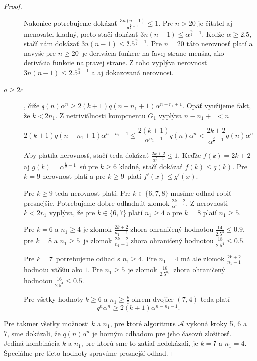 \begin{proof}
\begin{description}
    Nakoniec potrebujeme dokázať $\frac{3n(n-1)}{\alpha^{\frac{n}{2}-1}} \leq 1$. Pre $n > 20$ je čitateľ aj
    menovateľ kladný, preto stačí dokázať $3n(n-1) \leq \alpha^{\frac{n}{2} - 1}$. Keďže $\alpha \ge 2.5$,
    stačí nám dokázať $3n(n-1) \leq 2.5^{\frac{n}{2} - 1}$. Pre $n = 20$ táto nerovnosť platí a navyše
    pre $n \ge 20$ je derivácia funkcie na ľavej strane menšia, ako derivácia funkcie na pravej strane.
    Z toho vyplýva nerovnosť $3n(n-1) \leq 2.5^{\frac{n}{2}-1}$ a aj dokazovaná nerovnosť.

    \item[$\boxed{a \ge 2c}$], čiže $q(n) \alpha^n \ge 2(k+1)q(n - n_1 + 1)\alpha^{n - n_1 + 1}$.
    Opäť využijeme fakt, že $k < 2n_1$. Z netriviálnosti komponentu $G_1$ vyplýva $n - n_1 + 1 < n$ 

    $$2(k+1)q(n - n_1 + 1)\alpha^{n - n_1 + 1} \leq \frac{2(k+1)}{\alpha^{n_1 - 1}}q(n)\alpha^n < \frac{2k + 2}{\alpha^{\frac{k}{2} - 1}} q(n)\alpha^n$$

    Aby platila nerovnosť, stačí teda dokázať $\frac{2k + 2}{\alpha^{\frac{k}{2} - 1}} \leq 1$. Keďže
    $f(k) = 2k + 2$ aj $g(k) = \alpha^{\frac{k}{2} - 1}$ sú pre $k \ge 6$ kladné, stačí dokázať
    $f(k) \leq g(k)$. Pre $k = 9$ nerovnosť platí a pre $k \ge 9$ platí $f'(x) \leq g'(x)$.

    Pre $k \ge 9$ teda nerovnosť platí. Pre $k \in \{6, 7, 8\}$ musíme odhad robiť presnejšie.
    Potrebujeme dobre odhadnúť zlomok $\frac{2k+2}{\alpha^{n_1 - 1}}$. Z nerovnosti $k < 2n_1$
    vyplýva, že pre $k \in \{6, 7\}$ platí $n_1 \ge 4$ a pre $k = 8$ platí $n_1 \ge 5$.

    Pre $k=6$ a $n_1 \ge 4$ je zlomok $\frac{2k+2}{n_1 - 1}$ zhora ohraničený hodnotou $\frac{14}{2.5^3} \leq 0.9$,
    pre $k=8$ a $n_1 \ge 5$ je zlomok $\frac{2k+2}{n_1 - 1}$ zhora ohraničený hodnotou $\frac{18}{2.5^4} \leq 0.5$.

    Pre $k=7$ potrebujeme odhad s $n_1 \ge 4$. Pre $n_1 = 4$ má ale zlomok $\frac{2k+2}{n_1 - 1}$ hodnotu
    väčšiu ako $1$. Pre $n_1 \ge 5$ je zlomok $\frac{16}{2.5^{n_1}}$ zhora ohraničený hodnotou $\frac{16}{2.5^4} \leq 0.5$.

    Pre všetky hodnoty $k \ge 6$ a $n_1 \ge \frac{k}{2}$ okrem dvojice $(7, 4)$ teda platí
    $$q^n \alpha^n \ge 2(k+1)\alpha^{n - n_1 + 1}.$$

    \end{description}

    Pre takmer všetky možnosti $k$ a $n_1$, pre ktoré algoritmus $\mathcal{A}$ vykoná kroky 5, 6 a 7,
    sme dokázali, že $q(n) \alpha^n$ je horným odhadom pre jeho časovú zložitosť. Jediná kombinácia
    $k$ a $n_1$, pre ktorú sme to zatiaľ nedokázali, je $k=7$ a $n_1 = 4$. Špeciálne pre tieto hodnoty
    spravíme presnejší odhad.


\end{proof}
